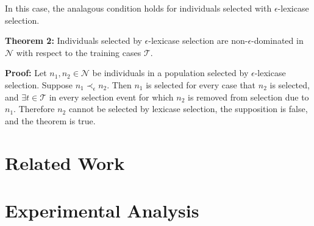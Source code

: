 \documentclass[preprint]{article}
\begin{document}
In this case, the analagous condition holds for individuals selected with $\epsilon$-lexicase selection. 

\medskip
\noindent \textbf{Theorem 2:} Individuals selected by $\epsilon$-lexicase selection are non-$\epsilon$-dominated in $\mathcal{N}$ with respect to the training cases $\mathcal{T}$. 
\medskip


\noindent \textbf{Proof:} Let $n_1, n_2 \in \mathcal{N}$ be individuals in a population selected by $\epsilon$-lexicase selection. Suppose $n_1 \prec_{\epsilon} n_2$. Then $n_1$ is selected for every case that $n_2$ is selected, and $\exists t \in \mathcal{T}$ in every selection event for which $n_2$ is removed from selection due to $n_1$. Therefore $n_2$ cannot be selected by lexicase selection, the supposition is false, and the theorem is true. 
\bigskip


\section{Related Work}\label{s:3}


\section{Experimental Analysis} \label{s:4}
\end{document}
